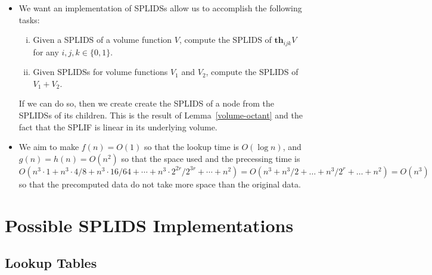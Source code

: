 \documentclass[10pt]{article}
\newcommand{\Th}{\mathbf{th}}
\begin{document}
\begin{itemize}
        \begin{proof}
            Just count the number of SPLIDS to be built
            in each level.
        \end{proof}
    
    \item We want an implementation of SPLIDSs allow us
        to accomplish the following tasks:        
        \begin{enumerate}[(i)]
            \item Given a SPLIDS of a volume function
            $V$, compute the SPLIDS of $\Th_{ijk}V$
            for any $i,j,k \in \{0,1\}.$
            
            \item Given SPLIDSs for volume functions
            $V_1$ and $V_2$, compute the SPLIDS of
            $V_1 + V_2$.
        \end{enumerate}        
        
        If we can do so, then we create create the SPLIDS of
        a node from the SPLIDSs of its children. This is
        the result of Lemma~\ref{volume-octant}
        and the fact that the SPLIF is linear in its underlying
        volume. 
    
    \item We aim to make $f(n) = O(1)$ so that
        the lookup time is $O(\log n)$, and $g(n) = h(n) = O(n^2)$
        so that the space used and the precessing time
        is
        $$O(n^3 \cdot 1 + n^3 \cdot 4 / 8 + n^3 \cdot 16 / 64
        + \dotsb + n^3 \cdot 2^{2r} / 2^{3r} + \dotsb + n^2)
        = O(n^3 + n^3/2 + \dotsc + n^3/2^r + \dotsc + n^2)
        = O(n^3)$$
        so that the precomputed data do not take more space
        than the original data.
\end{itemize}

\section{Possible SPLIDS Implementations}

\subsection{Lookup Tables}
\end{document}
